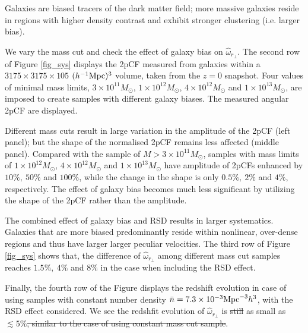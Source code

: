 \documentclass[iop]{emulateapj}
\providecommand{\DIFadd}[1]{{\protect\color{blue}\uwave{#1}}} %
\providecommand{\DIFdel}[1]{{\protect\color{red}\sout{#1}}}                      %
\providecommand{\DIFaddbegin}{} %
\providecommand{\DIFaddend}{} %
\providecommand{\DIFdelbegin}{} %
\providecommand{\DIFdelend}{} %
\begin{document}
Galaxies are biased tracers of the dark matter field;
more massive galaxies reside in regions with higher density contrast
and exhibit stronger clustering (i.e. larger bias).

We vary the mass cut and check the effect of galaxy bias on $\hat \omega_{r_\perp}$.
The second row of Figure \ref{fig_sys} displays the 2pCF measured from galaxies within a $3175\times3175\times105$ $(h^{-1}\rm Mpc)^3$ volume, taken from the $z=0$ snapshot.
Four values of minimal mass limits, $3\times 10^{11} M_{\odot}$, $1\times 10^{12} M_{\odot}$, $4\times 10^{12} M_{\odot}$ and $1\times 10^{13} M_{\odot}$,
are imposed to create samples with different galaxy biases.
The measured angular 2pCF are displayed.

Different mass cuts result in large variation in the amplitude of the 2pCF (left panel);
but the shape of the normalised 2pCF remains less affected (middle panel).
Compared with the sample of $M>3\times 10^{11} M_{\odot}$,
samples with mass limits of $1\times 10^{12} M_{\odot}$, $4\times 10^{12} M_{\odot}$ and $1\times 10^{13} M_{\odot}$
have amplitude of 2pCFs enhanced by $10\%,\ 50\%$ and $100\%$, 
while the change in the shape is only $0.5\%,\ 2\%$ and $4\%$, respectively.
The effect of galaxy bias becomes much less significant by utilizing the shape of the 2pCF rather than the amplitude.

The combined effect of galaxy bias and RSD results in larger systematics.
Galaxies that are more biased predominantly reside within nonlinear, over-dense regions and thus have larger larger peculiar velocities.
The third row of Figure \ref{fig_sys} shows that, 
the difference of $\hat \omega_{r_\perp}$ among different mass cut samples reaches $1.5\%,\ 4\%$ and $8\%$ in the case when including the RSD effect.

Finally, the fourth row of the Figure displays the 
redshift evolution in case of using samples with constant number density $\bar n=7.3\times 10^{-3} {\rm Mpc}^{-3}h^3$, 
with the RSD effect considered. %
We see the redshfit evolution of $\hat \omega_{r_\perp}$ is \DIFdelbegin \DIFdel{still }\DIFdelend as small as \DIFdelbegin \DIFdel{$\lesssim5\%$, similar to the case of using constant mass cut sample}\DIFdelend \DIFaddbegin \DIFadd{$\lesssim3\%$}\DIFaddend .
\end{document}
